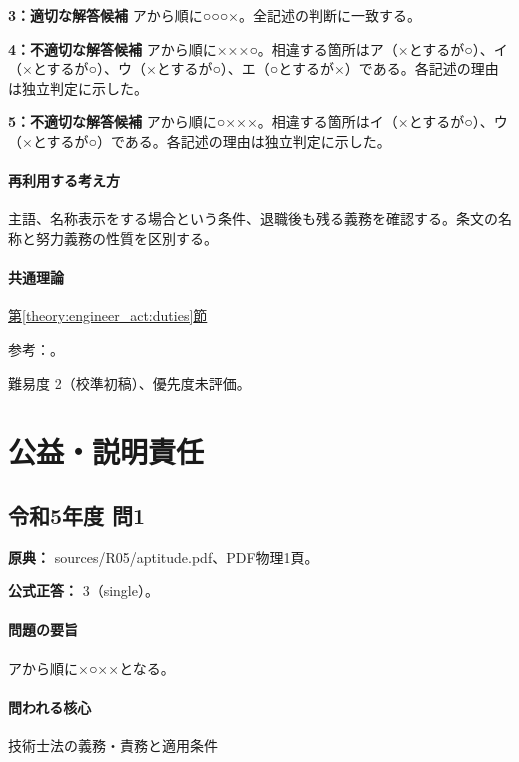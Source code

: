 \noindent\textbf{3：適切な解答候補} アから順に○○○×。全記述の判断に一致する。\par

\noindent\textbf{4：不適切な解答候補} アから順に×××○。相違する箇所はア（×とするが○）、イ（×とするが○）、ウ（×とするが○）、エ（○とするが×）である。各記述の理由は独立判定に示した。\par

\noindent\textbf{5：不適切な解答候補} アから順に○×××。相違する箇所はイ（×とするが○）、ウ（×とするが○）である。各記述の理由は独立判定に示した。\par

\paragraph{再利用する考え方} 主語、名称表示をする場合という条件、退職後も残る義務を確認する。条文の名称と努力義務の性質を区別する。

\paragraph{共通理論} \hyperref[theory:engineer_act:duties]{第\ref*{theory:engineer_act:duties}節}

\par 参考：\cite{engineer_act_current}。

\par 難易度 2（校準初稿）、優先度未評価。

\section{公益・説明責任}

\subsection{令和5年度 問1}
\label{q:r05-reg-apt-01}

\noindent\textbf{原典：} sources/R05/aptitude.pdf、PDF物理1頁。

\textbf{公式正答：} 3（single）。

\paragraph{問題の要旨} アから順に×○××となる。

\paragraph{問われる核心} 技術士法の義務・責務と適用条件

